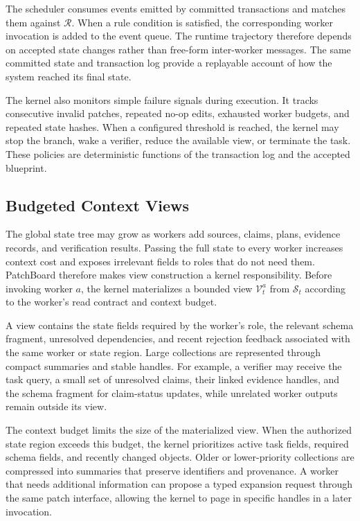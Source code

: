 \documentclass[11pt]{article}
\newcommand{\method}{PatchBoard}
\newcommand{\state}{\mathcal{S}}
\newcommand{\rules}{\mathcal{R}}
\newcommand{\view}{\mathcal{V}}
\begin{document}
The scheduler consumes events emitted by committed transactions and matches them against $\rules$. When a rule condition is satisfied, the corresponding worker invocation is added to the event queue. The runtime trajectory therefore depends on accepted state changes rather than free-form inter-worker messages. The same committed state and transaction log provide a replayable account of how the system reached its final state.

The kernel also monitors simple failure signals during execution. It tracks consecutive invalid patches, repeated no-op edits, exhausted worker budgets, and repeated state hashes. When a configured threshold is reached, the kernel may stop the branch, wake a verifier, reduce the available view, or terminate the task. These policies are deterministic functions of the transaction log and the accepted blueprint.

\subsection{Budgeted Context Views}
\label{sec:context-views}

The global state tree may grow as workers add sources, claims, plans, evidence records, and verification results. Passing the full state to every worker increases context cost and exposes irrelevant fields to roles that do not need them. \method{} therefore makes view construction a kernel responsibility. Before invoking worker $a$, the kernel materializes a bounded view $\view_t^a$ from $\state_t$ according to the worker's read contract and context budget.

A view contains the state fields required by the worker's role, the relevant schema fragment, unresolved dependencies, and recent rejection feedback associated with the same worker or state region. Large collections are represented through compact summaries and stable handles. For example, a verifier may receive the task query, a small set of unresolved claims, their linked evidence handles, and the schema fragment for claim-status updates, while unrelated worker outputs remain outside its view.

The context budget limits the size of the materialized view. When the authorized state region exceeds this budget, the kernel prioritizes active task fields, required schema fields, and recently changed objects. Older or lower-priority collections are compressed into summaries that preserve identifiers and provenance. A worker that needs additional information can propose a typed expansion request through the same patch interface, allowing the kernel to page in specific handles in a later invocation.
\end{document}
